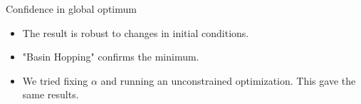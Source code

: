 \documentclass[11pt]{beamer}
\begin{document}
\begin{frame} {Confidence in global optimum}
	\begin{itemize}\itemsep 6pt
		\item The result is robust to changes in initial conditions.
		\item "Basin Hopping" confirms the minimum.
		\item We tried fixing $\alpha$ and running an unconstrained optimization. This gave the same results.
		\begin{center}
		\begin{figure}\centering\label{Innov5}
		\end{figure}
		\end{center}
	\end{itemize}
\end{frame}
\end{document}
